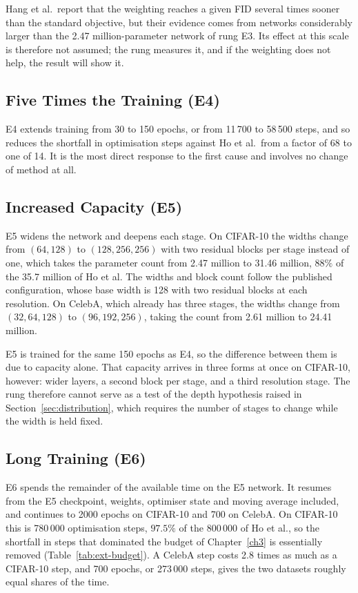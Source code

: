 Hang et al.\ report that the weighting reaches a given FID several times sooner than the standard
objective, but their evidence comes from networks considerably larger than the 2.47
million-parameter network of rung E3. Its
effect at this scale is therefore not assumed; the rung measures it, and if the weighting does not
help, the result will show it.

\subsection{Five Times the Training (E4)}

E4 extends training from 30 to 150 epochs, or from 11\,700 to 58\,500 steps, and so reduces the
shortfall in optimisation steps against Ho et al.\ from a factor of 68 to one of 14. It is the most
direct response to the first cause and involves no change of method at all.

\subsection{Increased Capacity (E5)}

E5 widens the network and deepens each stage. On CIFAR-10 the widths change from $(64, 128)$ to
$(128, 256, 256)$ with two residual blocks per stage instead of one, which takes the parameter count
from 2.47 million to 31.46 million, $88\%$ of the 35.7 million of Ho et al. The widths and block
count follow the published configuration, whose base width is 128 with two residual blocks at each
resolution. On CelebA, which already has three stages, the widths change from $(32, 64, 128)$ to
$(96, 192, 256)$, taking the count from 2.61 million to 24.41 million.

E5 is trained for the same 150 epochs as E4, so the difference between them is due to capacity
alone. That capacity arrives in three forms at once on CIFAR-10, however: wider layers, a second
block per stage, and a third resolution stage. The rung therefore cannot serve as a test of the depth
hypothesis raised in Section~\ref{sec:distribution}, which requires the number of stages to change
while the width is held fixed.

\subsection{Long Training (E6)}
\label{sec:ext-long}

E6 spends the remainder of the available time on the E5 network. It resumes from the E5 checkpoint,
weights, optimiser state and moving average included, and continues to 2000 epochs on CIFAR-10 and
700 on CelebA. On CIFAR-10 this is 780\,000 optimisation steps, $97.5\%$ of the 800\,000 of Ho et
al., so the shortfall in steps that dominated the budget of Chapter~\ref{ch3} is essentially removed
(Table~\ref{tab:ext-budget}). A CelebA step costs 2.8 times as much as a CIFAR-10 step, and 700 epochs,
or 273\,000 steps, gives the two datasets roughly equal shares of the time.

